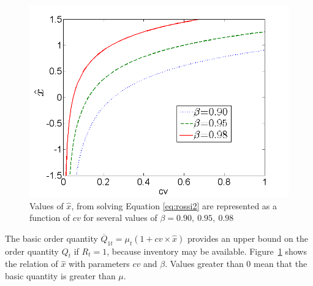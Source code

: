%
\begin{figure}[!bt]
\centering
\includegraphics[scale=0.30]{iccsa2015/figures/xhat_ncvnew.png}
\caption{Values of $\hat x$, from solving Equation \ref{eq:rossi2} are represented  as a function of $cv$ for several values of $\beta=0.90, \ 0.95, \ 0.98$ %
}
\label{fig:xhat_ncv}
\end{figure}
%
The basic order quantity $\overline Q_{1t}= \mu_t(1+cv\times\hat x)$ provides an upper bound on the order quantity $Q_t$ if $R_t=1$, because inventory may be available. Figure~\ref{fig:xhat_ncv} shows the relation of $\hat x$ with parameters $cv$ and $\beta$. Values greater than 0 mean that the basic quantity is greater than $\mu$.


